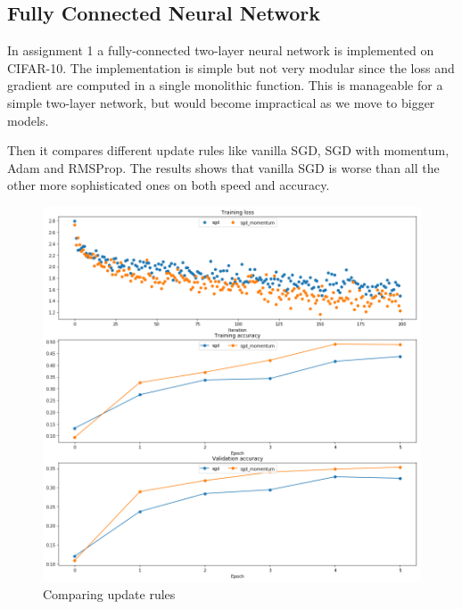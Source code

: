 \documentclass{article} %
\begin{document}
\subsection{Fully Connected Neural Network}
In assignment 1 a fully-connected two-layer neural network is implemented on CIFAR-10. The implementation is simple but not very modular since the loss and gradient are computed in a single monolithic function. This is manageable for a simple two-layer network, but would become impractical as we move to bigger models.

Then it compares different update rules like vanilla SGD, SGD with momentum, Adam and RMSProp. The results shows that vanilla SGD is worse than all the other more sophisticated ones on both speed and accuracy.
\begin{figure}[h]
	\centering
	\includegraphics[width=.8\textwidth]{update-rules.png}
	\caption{Comparing update rules}
\end{figure}
\end{document}
